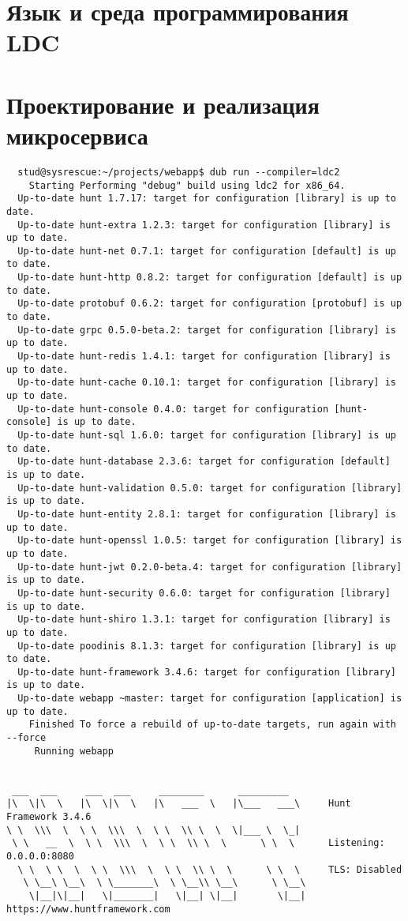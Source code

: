 \documentclass{studrep}
\begin{document}
\chapter{Язык и среда программирования LDC}



\chapter{Проектирование и реализация микросервиса}



\begin{verbatim}
  stud@sysrescue:~/projects/webapp$ dub run --compiler=ldc2
    Starting Performing "debug" build using ldc2 for x86_64.
  Up-to-date hunt 1.7.17: target for configuration [library] is up to date.
  Up-to-date hunt-extra 1.2.3: target for configuration [library] is up to date.
  Up-to-date hunt-net 0.7.1: target for configuration [default] is up to date.
  Up-to-date hunt-http 0.8.2: target for configuration [default] is up to date.
  Up-to-date protobuf 0.6.2: target for configuration [protobuf] is up to date.
  Up-to-date grpc 0.5.0-beta.2: target for configuration [library] is up to date.
  Up-to-date hunt-redis 1.4.1: target for configuration [library] is up to date.
  Up-to-date hunt-cache 0.10.1: target for configuration [library] is up to date.
  Up-to-date hunt-console 0.4.0: target for configuration [hunt-console] is up to date.
  Up-to-date hunt-sql 1.6.0: target for configuration [library] is up to date.
  Up-to-date hunt-database 2.3.6: target for configuration [default] is up to date.
  Up-to-date hunt-validation 0.5.0: target for configuration [library] is up to date.
  Up-to-date hunt-entity 2.8.1: target for configuration [library] is up to date.
  Up-to-date hunt-openssl 1.0.5: target for configuration [library] is up to date.
  Up-to-date hunt-jwt 0.2.0-beta.4: target for configuration [library] is up to date.
  Up-to-date hunt-security 0.6.0: target for configuration [library] is up to date.
  Up-to-date hunt-shiro 1.3.1: target for configuration [library] is up to date.
  Up-to-date poodinis 8.1.3: target for configuration [library] is up to date.
  Up-to-date hunt-framework 3.4.6: target for configuration [library] is up to date.
  Up-to-date webapp ~master: target for configuration [application] is up to date.
    Finished To force a rebuild of up-to-date targets, run again with --force
     Running webapp


 ___  ___     ___  ___     ________      _________
|\  \|\  \   |\  \|\  \   |\   ___  \   |\___   ___\     Hunt Framework 3.4.6
\ \  \\\  \  \ \  \\\  \  \ \  \\ \  \  \|___ \  \_|
 \ \   __  \  \ \  \\\  \  \ \  \\ \  \      \ \  \      Listening: 0.0.0.0:8080
  \ \  \ \  \  \ \  \\\  \  \ \  \\ \  \      \ \  \     TLS: Disabled
   \ \__\ \__\  \ \_______\  \ \__\\ \__\      \ \__\
    \|__|\|__|   \|_______|   \|__| \|__|       \|__|    https://www.huntframework.com



\end{verbatim}
\end{document}
